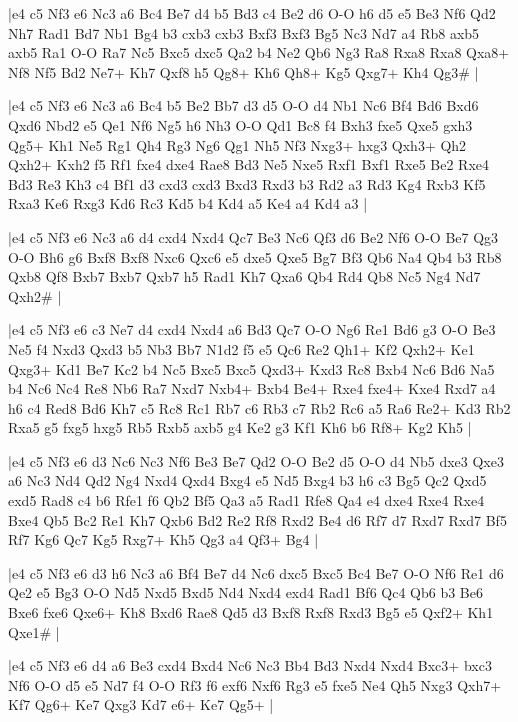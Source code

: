 \whitename{}
\blackname{}
\makegametitle
|e4 c5 Nf3 e6 Nc3 a6 Bc4 Be7 d4 b5 Bd3 c4 Be2 d6 O-O h6 d5 e5 Be3 Nf6 Qd2 Nh7 Rad1 Bd7 Nb1 Bg4 b3 cxb3 cxb3 Bxf3 Bxf3 Bg5 Nc3 Nd7 a4 Rb8 axb5 axb5 Ra1 O-O Ra7 Nc5 Bxc5 dxc5 Qa2 b4 Ne2 Qb6 Ng3 Ra8 Rxa8 Rxa8 Qxa8+ Nf8 Nf5 Bd2 Ne7+ Kh7 Qxf8 h5 Qg8+ Kh6 Qh8+ Kg5 Qxg7+ Kh4 Qg3\#  |

\whitename{}
\blackname{}
\makegametitle
|e4 c5 Nf3 e6 Nc3 a6 Bc4 b5 Be2 Bb7 d3 d5 O-O d4 Nb1 Nc6 Bf4 Bd6 Bxd6 Qxd6 Nbd2 e5 Qe1 Nf6 Ng5 h6 Nh3 O-O Qd1 Bc8 f4 Bxh3 fxe5 Qxe5 gxh3 Qg5+ Kh1 Ne5 Rg1 Qh4 Rg3 Ng6 Qg1 Nh5 Nf3 Nxg3+ hxg3 Qxh3+ Qh2 Qxh2+ Kxh2 f5 Rf1 fxe4 dxe4 Rae8 Bd3 Ne5 Nxe5 Rxf1 Bxf1 Rxe5 Be2 Rxe4 Bd3 Re3 Kh3 c4 Bf1 d3 cxd3 cxd3 Bxd3 Rxd3 b3 Rd2 a3 Rd3 Kg4 Rxb3 Kf5 Rxa3 Ke6 Rxg3 Kd6 Rc3 Kd5 b4 Kd4 a5 Ke4 a4 Kd4 a3  |

\whitename{}
\blackname{}
\makegametitle
|e4 c5 Nf3 e6 Nc3 a6 d4 cxd4 Nxd4 Qc7 Be3 Nc6 Qf3 d6 Be2 Nf6 O-O Be7 Qg3 O-O Bh6 g6 Bxf8 Bxf8 Nxc6 Qxc6 e5 dxe5 Qxe5 Bg7 Bf3 Qb6 Na4 Qb4 b3 Rb8 Qxb8 Qf8 Bxb7 Bxb7 Qxb7 h5 Rad1 Kh7 Qxa6 Qb4 Rd4 Qb8 Nc5 Ng4 Nd7 Qxh2\#  |

\whitename{}
\blackname{}
\makegametitle
|e4 c5 Nf3 e6 c3 Ne7 d4 cxd4 Nxd4 a6 Bd3 Qc7 O-O Ng6 Re1 Bd6 g3 O-O Be3 Ne5 f4 Nxd3 Qxd3 b5 Nb3 Bb7 N1d2 f5 e5 Qc6 Re2 Qh1+ Kf2 Qxh2+ Ke1 Qxg3+ Kd1 Be7 Kc2 b4 Nc5 Bxc5 Bxc5 Qxd3+ Kxd3 Rc8 Bxb4 Nc6 Bd6 Na5 b4 Nc6 Nc4 Re8 Nb6 Ra7 Nxd7 Nxb4+ Bxb4 Be4+ Rxe4 fxe4+ Kxe4 Rxd7 a4 h6 c4 Red8 Bd6 Kh7 c5 Rc8 Rc1 Rb7 c6 Rb3 c7 Rb2 Rc6 a5 Ra6 Re2+ Kd3 Rb2 Rxa5 g5 fxg5 hxg5 Rb5 Rxb5 axb5 g4 Ke2 g3 Kf1 Kh6 b6 Rf8+ Kg2 Kh5  |

\whitename{}
\blackname{}
\makegametitle
|e4 c5 Nf3 e6 d3 Nc6 Nc3 Nf6 Be3 Be7 Qd2 O-O Be2 d5 O-O d4 Nb5 dxe3 Qxe3 a6 Nc3 Nd4 Qd2 Ng4 Nxd4 Qxd4 Bxg4 e5 Nd5 Bxg4 b3 h6 c3 Bg5 Qc2 Qxd5 exd5 Rad8 c4 b6 Rfe1 f6 Qb2 Bf5 Qa3 a5 Rad1 Rfe8 Qa4 e4 dxe4 Rxe4 Rxe4 Bxe4 Qb5 Bc2 Re1 Kh7 Qxb6 Bd2 Re2 Rf8 Rxd2 Be4 d6 Rf7 d7 Rxd7 Rxd7 Bf5 Rf7 Kg6 Qc7 Kg5 Rxg7+ Kh5 Qg3 a4 Qf3+ Bg4  |

\whitename{}
\blackname{}
\makegametitle
|e4 c5 Nf3 e6 d3 h6 Nc3 a6 Bf4 Be7 d4 Nc6 dxc5 Bxc5 Bc4 Be7 O-O Nf6 Re1 d6 Qe2 e5 Bg3 O-O Nd5 Nxd5 Bxd5 Nd4 Nxd4 exd4 Rad1 Bf6 Qc4 Qb6 b3 Be6 Bxe6 fxe6 Qxe6+ Kh8 Bxd6 Rae8 Qd5 d3 Bxf8 Rxf8 Rxd3 Bg5 e5 Qxf2+ Kh1 Qxe1\#  |

\whitename{}
\blackname{}
\makegametitle
|e4 c5 Nf3 e6 d4 a6 Be3 cxd4 Bxd4 Nc6 Nc3 Bb4 Bd3 Nxd4 Nxd4 Bxc3+ bxc3 Nf6 O-O d5 e5 Nd7 f4 O-O Rf3 f6 exf6 Nxf6 Rg3 e5 fxe5 Ne4 Qh5 Nxg3 Qxh7+ Kf7 Qg6+ Ke7 Qxg3 Kd7 e6+ Ke7 Qg5+  |

